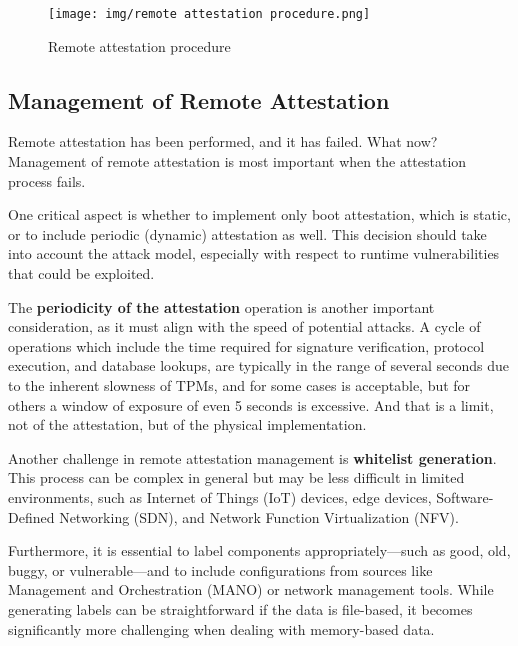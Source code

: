 \begin{figure}[H]
  \centering
  \texttt{[image: img/remote attestation
  procedure.png]}
  \caption{Remote attestation procedure}
\end{figure}

\subsection{Management of Remote Attestation}

Remote attestation has been performed, and it has failed. What now?
Management of remote attestation is most important when the
attestation process fails. 

One critical aspect is whether to implement only boot attestation,
which is static, or to include periodic (dynamic) attestation as well.
This decision should take into account the attack model, especially
with respect to runtime vulnerabilities that could be exploited.

The \textbf{periodicity of the attestation} operation is another
important consideration, as it must align with the speed of potential
attacks. A cycle of operations which include the time
required for signature verification, protocol execution, and database
lookups, are typically in the range of several seconds due to the
inherent slowness of TPMs, and for some cases is acceptable, but for
others a window of exposure of even 5 seconds is excessive. 
And that is a limit, not of the attestation, but of the physical
implementation.

Another challenge in remote attestation management is
\textbf{whitelist generation}. This process can be complex in general
but may be less difficult in limited environments, such as Internet of
Things (IoT) devices, edge devices, Software-Defined Networking (SDN),
and Network Function Virtualization (NFV). 

Furthermore, it is essential to label components appropriately—such as
good, old, buggy, or vulnerable—and to include configurations from
sources like Management and Orchestration (MANO) or network management
tools. While generating labels can be straightforward if the data is
file-based, it becomes significantly more challenging when dealing
with memory-based data.
